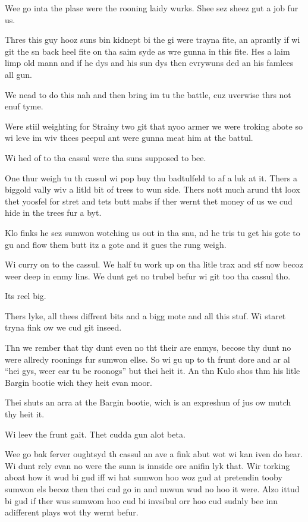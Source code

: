 Wee go inta the plase were the rooning laidy wurks. Shee sez sheez gut a job fur us.\medskip

Thres this guy hooz suns bin kidnept bi the gi were trayna fite, an aprantly if wi git the sn back heel fite on tha saim syde as wre gunna in this fite. Hes a laim limp old mann and if he dys and his sun dys then evrywuns ded an his famlees all gun.\medskip

We nead to do this nah and then bring im tu the battle, cuz uverwise thrs not enuf tyme.\medskip

Were stiil weighting for Strainy two git that nyoo armer we were troking abote so wi leve im wiv thees peepul ant were gunna meat him at the battul.\medskip

Wi hed of to tha cassul were tha suns supposed to bee.\medskip

One thur weigh tu th cassul wi pop buy thu badtulfeld to af a luk at it. Thers a biggold vally wiv a litld bit of trees to wun side. Thers nott much arund tht loox thet yoosfel for stret and tets butt mabs if ther wernt thet money of us we cud hide in the trees fur a byt.\medskip

Klo finks he sez sumwon wotching us out in tha snu, nd he tris tu get his gote to gu and flow them butt itz a gote and it gues the rung weigh.\medskip

Wi curry on to the cassul. We half tu work up on tha litle trax and stf now becoz weer deep in enmy lins. We dunt get no trubel befur wi git too tha cassul tho.\medskip

Its reel big.\medskip

Thers lyke, all thees diffrent bits and a bigg mote and all this stuf. Wi staret tryna fink ow we cud git inseed.\medskip

Thn we rember that thy dunt even no tht their are enmys, becose thy dunt no were allredy roonings fur sumwon ellse. So wi gu up to th frunt dore and ar al ``hei gys, weer ear tu be roonogs'' but thei heit it. An thn Kulo shos thm his litle Bargin bootie wich they heit evan moor.\medskip

Thei shuts an arra at the Bargin bootie, wich is an expreshun of jus ow mutch thy heit it.\medskip

Wi leev the frunt gait. Thet cudda gun alot beta.\medskip

Wee go bak ferver oughtsyd th cassul an ave a fink abut wot wi kan iven do hear. Wi dunt rely evan no were the sunn is innside ore anifin lyk that. Wir torking aboat how it wud bi gud iff wi hat sumwon hoo woz gud at pretendin tooby sumwon els becoz then thei cud go in and nuwun wud no hoo it were. Alzo ittud bi gud if ther wus sumwom hoo cud bi invsibul orr hoo cud sudnly bee inn adifferent plays wot thy wernt befur.\medskip

